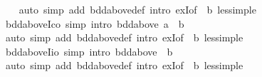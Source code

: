 \begin{isabellebody}
%
\isadelimproof
\ \ %
\endisadelimproof
%
\isatagproof
{}\isamarkupfalse%
\ {\isacharparenleft}{\kern0pt}auto\ simp\ add{\isacharcolon}{\kern0pt}\ bdd{\isacharunderscore}{\kern0pt}above{\isacharunderscore}{\kern0pt}def\ intro{\isacharbang}{\kern0pt}{\isacharcolon}{\kern0pt}\ exI{\isacharbrackleft}{\kern0pt}of\ {\isacharunderscore}{\kern0pt}\ b{\isacharbrackright}{\kern0pt}\ less{\isacharunderscore}{\kern0pt}imp{\isacharunderscore}{\kern0pt}le{\isacharparenright}{\kern0pt}%
\endisatagproof
{\isafoldproof}%
%
\isadelimproof
\isanewline
%
\endisadelimproof
\isanewline
{}\isamarkupfalse%
\ bdd{\isacharunderscore}{\kern0pt}above{\isacharunderscore}{\kern0pt}Ico\ {\isacharbrackleft}{\kern0pt}simp{\isacharcomma}{\kern0pt}\ intro{\isacharbrackright}{\kern0pt}{\isacharcolon}{\kern0pt}\ {\isachardoublequoteopen}bdd{\isacharunderscore}{\kern0pt}above\ {\isacharbraceleft}{\kern0pt}a\ {\isachardot}{\kern0pt}{\isachardot}{\kern0pt}{\isacharless}{\kern0pt}\ b{\isacharbraceright}{\kern0pt}{\isachardoublequoteclose}\isanewline
%
\isadelimproof
\ \ %
\endisadelimproof
%
\isatagproof
{}\isamarkupfalse%
\ {\isacharparenleft}{\kern0pt}auto\ simp\ add{\isacharcolon}{\kern0pt}\ bdd{\isacharunderscore}{\kern0pt}above{\isacharunderscore}{\kern0pt}def\ intro{\isacharbang}{\kern0pt}{\isacharcolon}{\kern0pt}\ exI{\isacharbrackleft}{\kern0pt}of\ {\isacharunderscore}{\kern0pt}\ b{\isacharbrackright}{\kern0pt}\ less{\isacharunderscore}{\kern0pt}imp{\isacharunderscore}{\kern0pt}le{\isacharparenright}{\kern0pt}%
\endisatagproof
{\isafoldproof}%
%
\isadelimproof
\isanewline
%
\endisadelimproof
\isanewline
{}\isamarkupfalse%
\ bdd{\isacharunderscore}{\kern0pt}above{\isacharunderscore}{\kern0pt}Iio\ {\isacharbrackleft}{\kern0pt}simp{\isacharcomma}{\kern0pt}\ intro{\isacharbrackright}{\kern0pt}{\isacharcolon}{\kern0pt}\ {\isachardoublequoteopen}bdd{\isacharunderscore}{\kern0pt}above\ {\isacharbraceleft}{\kern0pt}{\isachardot}{\kern0pt}{\isachardot}{\kern0pt}{\isacharless}{\kern0pt}\ b{\isacharbraceright}{\kern0pt}{\isachardoublequoteclose}\isanewline
%
\isadelimproof
\ \ %
\endisadelimproof
%
\isatagproof
{}\isamarkupfalse%
\ {\isacharparenleft}{\kern0pt}auto\ simp\ add{\isacharcolon}{\kern0pt}\ bdd{\isacharunderscore}{\kern0pt}above{\isacharunderscore}{\kern0pt}def\ intro{\isacharcolon}{\kern0pt}\ exI{\isacharbrackleft}{\kern0pt}of\ {\isacharunderscore}{\kern0pt}\ b{\isacharbrackright}{\kern0pt}\ less{\isacharunderscore}{\kern0pt}imp{\isacharunderscore}{\kern0pt}le{\isacharparenright}{\kern0pt}%
\endisatagproof
{\isafoldproof}%

\end{isabellebody}

